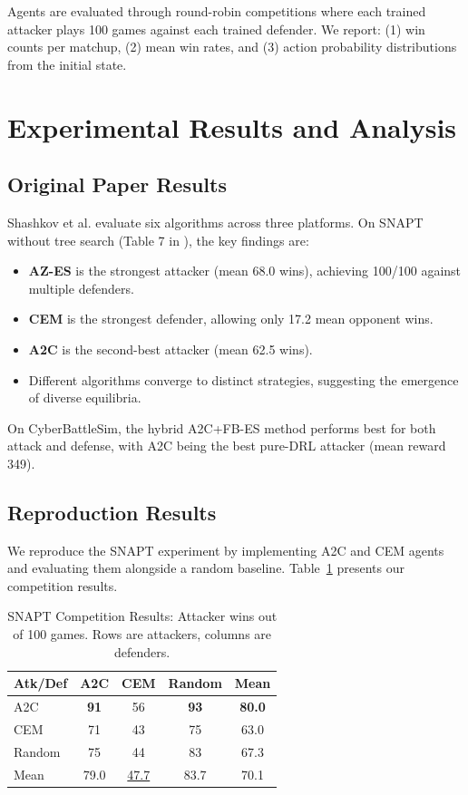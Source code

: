 \documentclass[conference, 10pt]{IEEEtran}
\begin{document}
Agents are evaluated through round-robin competitions where each trained attacker plays 100 games against each trained defender. We report: (1) win counts per matchup, (2) mean win rates, and (3) action probability distributions from the initial state.

\section{Experimental Results and Analysis}
\label{sec:results}

\subsection{Original Paper Results}

Shashkov et al. evaluate six algorithms across three platforms. On SNAPT without tree search (Table 7 in \cite{shashkov2023}), the key findings are:

\begin{itemize}
    \item \textbf{AZ-ES} is the strongest attacker (mean 68.0 wins), achieving 100/100 against multiple defenders.
    \item \textbf{CEM} is the strongest defender, allowing only 17.2 mean opponent wins.
    \item \textbf{A2C} is the second-best attacker (mean 62.5 wins).
    \item Different algorithms converge to distinct strategies, suggesting the emergence of diverse equilibria.
\end{itemize}

On CyberBattleSim, the hybrid A2C+FB-ES method performs best for both attack and defense, with A2C being the best pure-DRL attacker (mean reward 349).

\subsection{Reproduction Results}

We reproduce the SNAPT experiment by implementing A2C and CEM agents and evaluating them alongside a random baseline. Table~\ref{tab:competition} presents our competition results.

\begin{table}[h]
\centering
\caption{SNAPT Competition Results: Attacker wins out of 100 games. Rows are attackers, columns are defenders.}
\label{tab:competition}
\begin{tabular}{lcccc}
\toprule
\textbf{Atk/Def} & \textbf{A2C} & \textbf{CEM} & \textbf{Random} & \textbf{Mean} \\
\midrule
A2C    & \textbf{91} & 56 & \textbf{93} & \textbf{80.0} \\
CEM    & 71 & 43 & 75 & 63.0 \\
Random & 75 & 44 & 83 & 67.3 \\
\midrule
Mean   & 79.0 & \underline{47.7} & 83.7 & 70.1 \\
\bottomrule
\end{tabular}
\end{table}
\end{document}
